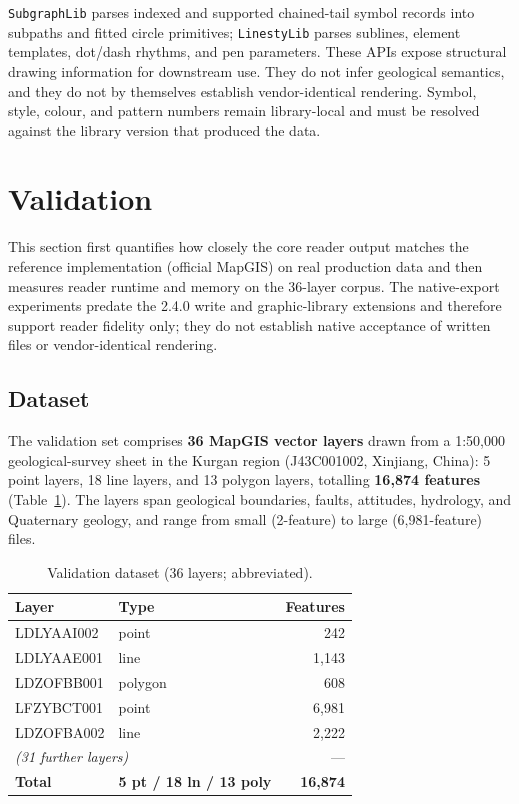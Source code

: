\documentclass[11pt,a4paper]{article}
\begin{document}
\texttt{SubgraphLib} parses indexed and supported chained-tail symbol records into subpaths and fitted circle primitives; \texttt{LinestyLib} parses sublines, element templates, dot/dash rhythms, and pen parameters. These APIs expose structural drawing information for downstream use. They do not infer geological semantics, and they do not by themselves establish vendor-identical rendering. Symbol, style, colour, and pattern numbers remain library-local and must be resolved against the library version that produced the data.

\section{Validation}
This section first quantifies how closely the core reader output matches the reference implementation (official MapGIS) on real production data and then measures reader runtime and memory on the 36-layer corpus. The native-export experiments predate the 2.4.0 write and graphic-library extensions and therefore support reader fidelity only; they do not establish native acceptance of written files or vendor-identical rendering.

\subsection{Dataset}
The validation set comprises \textbf{36 MapGIS vector layers} drawn from a 1:50{,}000 geological-survey sheet in the Kurgan region (J43C001002, Xinjiang, China): 5 point layers, 18 line layers, and 13 polygon layers, totalling \textbf{16{,}874 features} (Table~\ref{tab:dataset}). The layers span geological boundaries, faults, attitudes, hydrology, and Quaternary geology, and range from small (2-feature) to large (6{,}981-feature) files.

\begin{table}[h]
\centering
\caption{Validation dataset (36 layers; abbreviated).}
\label{tab:dataset}
\begin{tabular}{llr}
\toprule
Layer & Type & Features \\
\midrule
LDLYAAI002 & point & 242 \\
LDLYAAE001 & line & 1{,}143 \\
LDZOFBB001 & polygon & 608 \\
LFZYBCT001 & point & 6{,}981 \\
LDZOFBA002 & line & 2{,}222 \\
\multicolumn{2}{l}{\emph{(31 further layers)}} & --- \\
\midrule
\textbf{Total} & \textbf{5 pt / 18 ln / 13 poly} & \textbf{16{,}874} \\
\bottomrule
\end{tabular}
\end{table}
\end{document}
